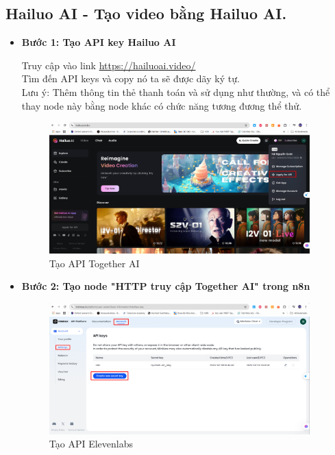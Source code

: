 \subsection{Hailuo AI - Tạo video bằng Hailuo AI.}
\begin{itemize}[label=]
    \item \textbf{Bước 1: Tạo API key Hailuo AI} 
    
    Truy cập vào link \url{https://hailuoai.video/} \\ 
    Tìm đến API keys và copy nó ta sẽ được dãy ký tự.\\
    Lưu ý: Thêm thông tin thẻ thanh toán và sử dụng như thường, và có thể thay node này bằng node khác có chức năng tương đương thể thử.\\
    
    \begin{figure}[H]
    \centering
    \includegraphics[width=0.95\textwidth]{images/HailuoAI.png}
    \caption{Tạo API Together AI}
    
    \end{figure}
    \item \textbf{Bước 2: Tạo node "HTTP truy cập Together AI" trong n8n}\\
    \begin{figure}[H]
    \centering
    \includegraphics[width=0.95\textwidth]{images/HailuoAI-1.png}
    \caption{Tạo API Elevenlabs}
    

\end{figure}
\end{itemize}
